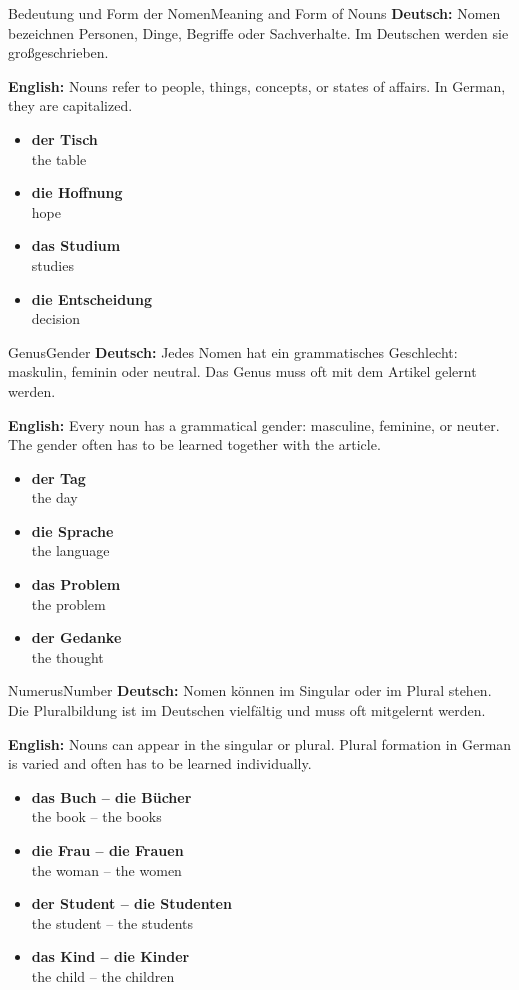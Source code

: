 \documentclass[a4paper,11pt]{article}
\newcommand{\GermanText}[1]{\textbf{Deutsch: }#1\par}
\newcommand{\EnglishText}[1]{{\color{SoftGray}\textbf{English: }#1\par}}
\newcommand{\ExampleItem}[2]{\item \textbf{#1}\\{\color{SoftGray}#2}}
\begin{document}
\begin{grammarentry}{Bedeutung und Form der Nomen}{Meaning and Form of Nouns}
    \GermanText{Nomen bezeichnen Personen, Dinge, Begriffe oder Sachverhalte. Im Deutschen werden sie großgeschrieben.}
    \EnglishText{Nouns refer to people, things, concepts, or states of affairs. In German, they are capitalized.}
    \begin{exbox}
        \begin{itemize}
            \ExampleItem{der Tisch}{the table}
            \ExampleItem{die Hoffnung}{hope}
            \ExampleItem{das Studium}{studies}
            \ExampleItem{die Entscheidung}{decision}
        \end{itemize}
    \end{exbox}
\end{grammarentry}

\begin{grammarentry}{Genus}{Gender}
    \GermanText{Jedes Nomen hat ein grammatisches Geschlecht: maskulin, feminin oder neutral. Das Genus muss oft mit dem Artikel gelernt werden.}
    \EnglishText{Every noun has a grammatical gender: masculine, feminine, or neuter. The gender often has to be learned together with the article.}
    \begin{exbox}
        \begin{itemize}
            \ExampleItem{der Tag}{the day}
            \ExampleItem{die Sprache}{the language}
            \ExampleItem{das Problem}{the problem}
            \ExampleItem{der Gedanke}{the thought}
        \end{itemize}
    \end{exbox}
\end{grammarentry}

\begin{grammarentry}{Numerus}{Number}
    \GermanText{Nomen können im Singular oder im Plural stehen. Die Pluralbildung ist im Deutschen vielfältig und muss oft mitgelernt werden.}
    \EnglishText{Nouns can appear in the singular or plural. Plural formation in German is varied and often has to be learned individually.}
    \begin{exbox}
        \begin{itemize}
            \ExampleItem{das Buch -- die Bücher}{the book -- the books}
            \ExampleItem{die Frau -- die Frauen}{the woman -- the women}
            \ExampleItem{der Student -- die Studenten}{the student -- the students}
            \ExampleItem{das Kind -- die Kinder}{the child -- the children}
        \end{itemize}
    \end{exbox}
\end{grammarentry}
\end{document}
